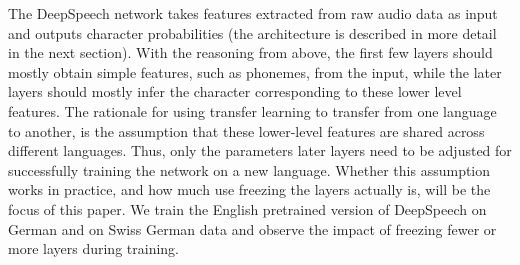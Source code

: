 \documentclass[11pt]{article}
\newcommand{\tz}[1]{\textcolor{red}{\textbf{TZ:} #1}}
\newcommand{\tz}[1]{}
\begin{document}
The DeepSpeech network takes features extracted from raw audio data as input and outputs character probabilities (the architecture is described in more detail in the next section). With the reasoning from above, the first few layers should mostly obtain simple features, such as phonemes, from the input, while the later layers should mostly infer the character corresponding to these lower level features. The rationale for using transfer learning to transfer from one language to another, is the assumption that these lower-level features are shared across different languages. Thus, only the parameters later layers need to be adjusted for successfully training the network on a new language. Whether this assumption works in practice, and how much use freezing the layers actually is, will be the focus of this paper. We train the English pretrained version of DeepSpeech on German and on Swiss German data and observe the impact of freezing fewer or more layers during training.
%
%
%
%
%
%
%
%
\end{document}
